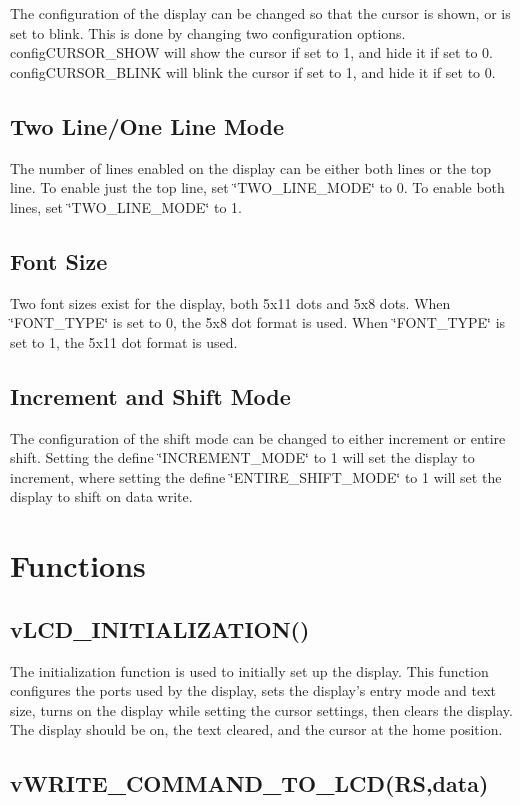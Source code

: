 The configuration of the display can be changed so that the cursor is shown, or is set to blink. This is done by changing two configuration options. config\-C\-U\-R\-S\-O\-R\-\_\-\-S\-H\-O\-W will show the cursor if set to 1, and hide it if set to 0. config\-C\-U\-R\-S\-O\-R\-\_\-\-B\-L\-I\-N\-K will blink the cursor if set to 1, and hide it if set to 0.\hypertarget{_usage_twoline}{}\subsection{Two Line/\-One Line Mode}\label{_usage_twoline}
The number of lines enabled on the display can be either both lines or the top line. To enable just the top line, set \char`\"{}\-T\-W\-O\-\_\-\-L\-I\-N\-E\-\_\-\-M\-O\-D\-E\char`\"{} to 0. To enable both lines, set \char`\"{}\-T\-W\-O\-\_\-\-L\-I\-N\-E\-\_\-\-M\-O\-D\-E\char`\"{} to 1.\hypertarget{_usage_font}{}\subsection{Font Size}\label{_usage_font}
Two font sizes exist for the display, both 5x11 dots and 5x8 dots. When \char`\"{}\-F\-O\-N\-T\-\_\-\-T\-Y\-P\-E\char`\"{} is set to 0, the 5x8 dot format is used. When \char`\"{}\-F\-O\-N\-T\-\_\-\-T\-Y\-P\-E\char`\"{} is set to 1, the 5x11 dot format is used.\hypertarget{_usage_Mode}{}\subsection{Increment and Shift Mode}\label{_usage_Mode}
The configuration of the shift mode can be changed to either increment or entire shift. Setting the define \char`\"{}\-I\-N\-C\-R\-E\-M\-E\-N\-T\-\_\-\-M\-O\-D\-E\char`\"{} to 1 will set the display to increment, where setting the define \char`\"{}\-E\-N\-T\-I\-R\-E\-\_\-\-S\-H\-I\-F\-T\-\_\-\-M\-O\-D\-E\char`\"{} to 1 will set the display to shift on data write.\hypertarget{_usage_functions}{}\section{Functions}\label{_usage_functions}
\hypertarget{_usage_Initialization}{}\subsection{v\-L\-C\-D\-\_\-\-I\-N\-I\-T\-I\-A\-L\-I\-Z\-A\-T\-I\-O\-N()}\label{_usage_Initialization}
The initialization function is used to initially set up the display. This function configures the ports used by the display, sets the display's entry mode and text size, turns on the display while setting the cursor settings, then clears the display. The display should be on, the text cleared, and the cursor at the home position.\hypertarget{_usage_write_command}{}\subsection{v\-W\-R\-I\-T\-E\-\_\-\-C\-O\-M\-M\-A\-N\-D\-\_\-\-T\-O\-\_\-\-L\-C\-D(\-R\-S,data)}\label{_usage_write_command}
